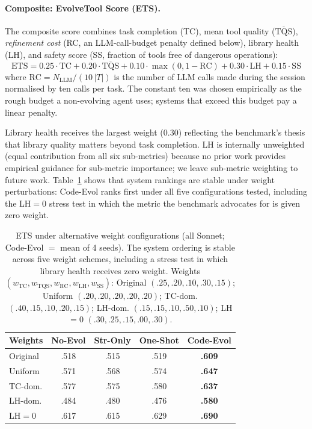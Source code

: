 \documentclass[sigconf,anonymous,review,natbib=false]{acmart}
\begin{document}
\paragraph{Composite: EvolveTool Score (ETS).}
The composite score combines task completion (TC), mean tool quality ($\overline{\text{TQS}}$), \emph{refinement cost} (RC, an LLM-call-budget penalty defined below), library health (LH), and safety score (SS, fraction of tools free of dangerous operations):
\begin{equation}
\text{ETS} = 0.25 \!\cdot\! \text{TC} + 0.20 \!\cdot\! \overline{\text{TQS}} + 0.10 \!\cdot\! \max(0, 1{-}\text{RC}) + 0.30 \!\cdot\! \text{LH} + 0.15 \!\cdot\! \text{SS}
\end{equation}
where $\text{RC} = N_{\text{LLM}} / (10\,|T|)$ is the number of LLM calls made during the session normalised by ten calls per task. The constant ten was chosen empirically as the rough budget a non-evolving agent uses; systems that exceed this budget pay a linear penalty.

Library health receives the largest weight (0.30) reflecting the benchmark's thesis that library quality matters beyond task completion. LH is internally unweighted (equal contribution from all six sub-metrics) because no prior work provides empirical guidance for sub-metric importance; we leave sub-metric weighting to future work. Table~\ref{tab:ets_sensitivity} shows that system rankings are stable under weight perturbations: Code-Evol ranks first under all five configurations tested, including the LH$=$0 stress test in which the metric the benchmark advocates for is given zero weight.

\begin{table}[t]
\centering\footnotesize
\begin{tabular}{lcccc}
\toprule
\textbf{Weights} & \textbf{No-Evol} & \textbf{Str-Only} & \textbf{One-Shot} & \textbf{Code-Evol} \\
\midrule
Original   & .518 & .515 & .519 & \textbf{.609} \\
Uniform    & .571 & .568 & .574 & \textbf{.647} \\
TC-dom.    & .577 & .575 & .580 & \textbf{.637} \\
LH-dom.    & .484 & .480 & .476 & \textbf{.580} \\
LH${=}$0   & .617 & .615 & .629 & \textbf{.690} \\
\bottomrule
\end{tabular}
\caption{ETS under alternative weight configurations (all Sonnet; Code-Evol $=$ mean of 4 seeds). The system ordering is stable across five weight schemes, including a stress test in which library health receives zero weight. Weights $(w_{\text{TC}}, w_{\text{TQS}}, w_{\text{RC}}, w_{\text{LH}}, w_{\text{SS}})$: Original $(.25,.20,.10,.30,.15)$; Uniform $(.20,.20,.20,.20,.20)$; TC-dom. $(.40,.15,.10,.20,.15)$; LH-dom. $(.15,.15,.10,.50,.10)$; LH${=}$0 $(.30,.25,.15,.00,.30)$.}
\label{tab:ets_sensitivity}
\end{table}
\end{document}
